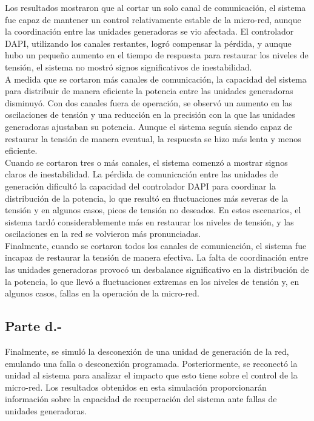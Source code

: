 Los resultados mostraron que al cortar un solo canal de comunicación, el sistema fue capaz de mantener un control relativamente estable de la micro-red, aunque la coordinación entre las unidades generadoras se vio afectada. El controlador DAPI, utilizando los canales restantes, logró compensar la pérdida, y aunque hubo un pequeño aumento en el tiempo de respuesta para restaurar los niveles de tensión, el sistema no mostró signos significativos de inestabilidad.\\

A medida que se cortaron más canales de comunicación, la capacidad del sistema para distribuir de manera eficiente la potencia entre las unidades generadoras disminuyó. Con dos canales fuera de operación, se observó un aumento en las oscilaciones de tensión y una reducción en la precisión con la que las unidades generadoras ajustaban su potencia. Aunque el sistema seguía siendo capaz de restaurar la tensión de manera eventual, la respuesta se hizo más lenta y menos eficiente.\\

Cuando se cortaron tres o más canales, el sistema comenzó a mostrar signos claros de inestabilidad. La pérdida de comunicación entre las unidades de generación dificultó la capacidad del controlador DAPI para coordinar la distribución de la potencia, lo que resultó en fluctuaciones más severas de la tensión y en algunos casos, picos de tensión no deseados. En estos escenarios, el sistema tardó considerablemente más en restaurar los niveles de tensión, y las oscilaciones en la red se volvieron más pronunciadas.\\

Finalmente, cuando se cortaron todos los canales de comunicación, el sistema fue incapaz de restaurar la tensión de manera efectiva. La falta de coordinación entre las unidades generadoras provocó un desbalance significativo en la distribución de la potencia, lo que llevó a fluctuaciones extremas en los niveles de tensión y, en algunos casos, fallas en la operación de la micro-red.

\subsection{Parte d.-}

Finalmente, se simuló la desconexión de una unidad de generación de la red, emulando una falla o desconexión programada. Posteriormente, se reconectó la unidad al sistema para analizar el impacto que esto tiene sobre el control de la micro-red. Los resultados obtenidos en esta simulación proporcionarán información sobre la capacidad de recuperación del sistema ante fallas de unidades generadoras.

